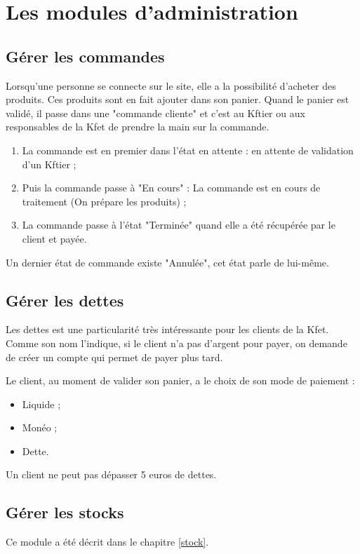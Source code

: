\documentclass[twoside,UTF8]{EPURapport}
\begin{document}
\section{Les modules d'administration}
    \subsection{Gérer les commandes}
Lorsqu'une personne se connecte sur le site, elle a la possibilité d'acheter des produits. Ces produits sont en fait
ajouter dans son panier. Quand le panier est validé, il passe dans une "commande cliente" et c'est au Kftier ou aux
responsables de la Kfet de prendre la main sur la commande.
\begin{enumerate}
    \item La commande est en premier dans l'état en attente : en attente de validation d'un Kftier ;
    \item Puis la commande passe à "En cours" : La commande est en cours de traitement (On prépare les produits) ;
    \item La commande passe à l'état "Terminée" quand elle a été récupérée par le client et payée.
\end{enumerate}

Un dernier état de commande existe "Annulée", cet état parle de lui-même.


    \subsection{Gérer les dettes}
Les dettes est une particularité très intéressante pour les clients de la Kfet. Comme son nom l'indique, si le client n'a pas d'argent pour payer, on demande de créer un compte qui permet de payer plus tard.

Le client, au moment de valider son panier, a le choix de son mode de paiement : 
\begin{itemize}
    \item Liquide ;
    \item Monéo ;
    \item Dette.
\end{itemize}

Un client ne peut pas dépasser 5 euros de dettes.

    \subsection{Gérer les stocks}
Ce module a été décrit dans le chapitre \ref{stock}.
\end{document}
